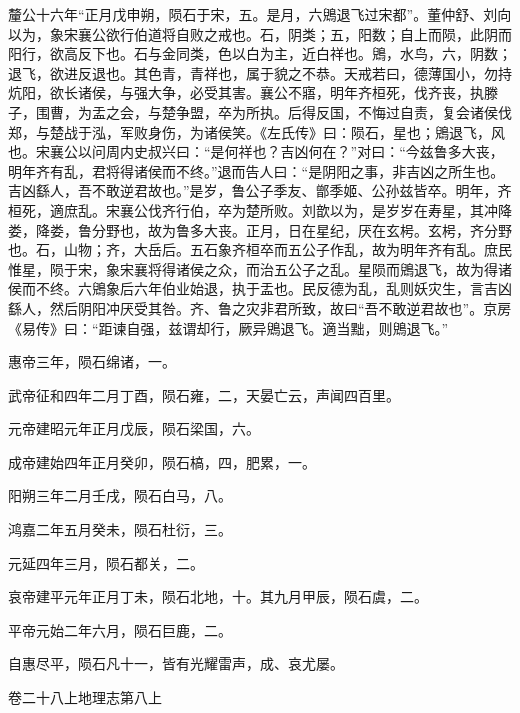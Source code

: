 \documentclass[12pt,UTF8]{ctexbook}
\begin{document}
釐公十六年“正月戊申朔，陨石于宋，五。是月，六鶂退飞过宋都”。董仲舒、刘向以为，象宋襄公欲行伯道将自败之戒也。石，阴类；五，阳数；自上而陨，此阴而阳行，欲高反下也。石与金同类，色以白为主，近白祥也。鶂，水鸟，六，阴数；退飞，欲进反退也。其色青，青祥也，属于貌之不恭。天戒若曰，德薄国小，勿持炕阳，欲长诸侯，与强大争，必受其害。襄公不寤，明年齐桓死，伐齐丧，执滕子，围曹，为盂之会，与楚争盟，卒为所执。后得反国，不悔过自责，复会诸侯伐郑，与楚战于泓，军败身伤，为诸侯笑。《左氏传》曰：陨石，星也；鶂退飞，风也。宋襄公以问周内史叔兴曰：“是何祥也？吉凶何在？”对曰：“今兹鲁多大丧，明年齐有乱，君将得诸侯而不终。”退而告人曰：“是阴阳之事，非吉凶之所生也。吉凶繇人，吾不敢逆君故也。”是岁，鲁公子季友、鄫季姬、公孙兹皆卒。明年，齐桓死，適庶乱。宋襄公伐齐行伯，卒为楚所败。刘歆以为，是岁岁在寿星，其冲降娄，降娄，鲁分野也，故为鲁多大丧。正月，日在星纪，厌在玄枵。玄枵，齐分野也。石，山物；齐，大岳后。五石象齐桓卒而五公子作乱，故为明年齐有乱。庶民惟星，陨于宋，象宋襄将得诸侯之众，而治五公子之乱。星陨而鶂退飞，故为得诸侯而不终。六鶂象后六年伯业始退，执于盂也。民反德为乱，乱则妖灾生，言吉凶繇人，然后阴阳冲厌受其咎。齐、鲁之灾非君所致，故曰“吾不敢逆君故也”。京房《易传》曰：“距谏自强，兹谓却行，厥异鶂退飞。適当黜，则鶂退飞。”



惠帝三年，陨石绵诸，一。



武帝征和四年二月丁酉，陨石雍，二，天晏亡云，声闻四百里。



元帝建昭元年正月戊辰，陨石梁国，六。



成帝建始四年正月癸卯，陨石槁，四，肥累，一。



阳朔三年二月壬戌，陨石白马，八。



鸿嘉二年五月癸未，陨石杜衍，三。



元延四年三月，陨石都关，二。



哀帝建平元年正月丁未，陨石北地，十。其九月甲辰，陨石虞，二。



平帝元始二年六月，陨石巨鹿，二。



自惠尽平，陨石凡十一，皆有光耀雷声，成、哀尤屡。





卷二十八上地理志第八上
\end{document}
